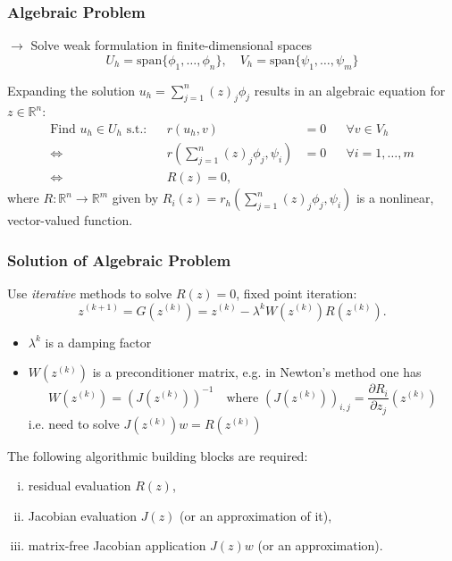 \documentclass[ignorenonframetext,11pt]{beamer}
\theoremstyle{definition}
\begin{document}
\begin{frame}
\frametitle{Algebraic Problem}
$\to$ Solve weak formulation in finite-dimensional spaces
\begin{equation*}
U_h=\text{span}\{\phi_1,\ldots,\phi_n\}, \quad V_h=\text{span}\{\psi_1,\ldots,\psi_m\}
\end{equation*}

Expanding the solution $u_h=\sum_{j=1}^n (z)_j\phi_j$ 
results in an algebraic equation for $z\in\mathbb{R}^n$:
\begin{align*}
\text{Find $u_h\in U_h$ s.t.:} && r(u_h,v)&=0 && \forall v\in V_h\\
\Leftrightarrow{} && r\left(\sum_{j=1}^n (z)_j\phi_j,\psi_i\right) &= 0 &&\forall i=1,\ldots,m\\
\Leftrightarrow{} && R(z) = 0,
\end{align*}
where $R: \mathbb{R}^n \to \mathbb{R}^m$ given by 
$R_i(z) = r_h\left(\sum_{j=1}^n (z)_j\phi_j,\psi_i\right)$ is a nonlinear, vector-valued function.
\end{frame}

\begin{frame}
\frametitle{Solution of Algebraic Problem}
Use {\em iterative} methods to solve $R(z)=0$, fixed point iteration:
\begin{equation}
z^{(k+1)} = G(z^{(k)}) = z^{(k)} - \lambda^{k} W(z^{(k)}) R(z^{(k)}) .
\end{equation}
\vspace{-5mm}
\begin{itemize}
\item $\lambda^{k}$ is a damping factor
\item $W(z^{(k)})$ is a preconditioner matrix, e.g. in Newton's method one has 
\begin{equation*}
W(z^{(k)}) = (J(z^{(k)}))^{-1} \quad \text{where $(J(z^{(k)}))_{i,j} = \frac{\partial R_i}{\partial z_j}
(z^{(k)})$}
\end{equation*}
i.e. need to solve $J\left(z^{(k)}\right) w = R(z^{(k)})$
\end{itemize}
The following algorithmic building blocks are required:
\begin{enumerate}[i)]
\item residual evaluation $R(z)$,
\item Jacobian evaluation $J(z)$ (or an approximation of it),
\item matrix-free Jacobian application $J(z) w$ (or an approximation).
\end{enumerate}
\end{frame}
\end{document}
